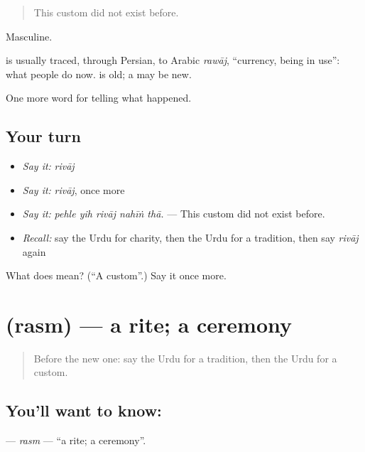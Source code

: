\begin{quote}
This custom did not exist before.
\end{quote}

Masculine.

\begin{cousinweb}
is usually traced, through Persian, to Arabic \emph{rawāj}, \textquotedblleft{}currency, being in use\textquotedblright{}: what people do now. \textbf{} is old; a \textbf{} may be new.
\end{cousinweb}

\begin{grammarlens}[title={What you've built}]
One more word for telling what happened.
\end{grammarlens}

\subsection*{Your turn}
\begin{itemize}
\raggedright
  \item \emph{Say it:} \emph{rivāj}
  \item \emph{Say it:} \emph{rivāj}, once more
  \item \emph{Say it:} \emph{pehle yih rivāj nahīṅ thā.} — This custom did not exist before.
  \item \emph{Recall:} say the Urdu for charity, then the Urdu for a tradition, then say \emph{rivāj} again
\end{itemize}

\begin{tcolorbox}[breakable,colback=teal!4,colframe=teal!35!black,title={Before you move on}]
What does  mean? (\textquotedblleft{}A custom\textquotedblright{}.) Say it once more.
\end{tcolorbox}
\section[\texorpdfstring{\ur{رسم} (rasm)}{رسم (rasm)}]{ (rasm) — a rite; a ceremony}

\label{lesson:UR-C323-rasm}



\begin{quote}
Before the new one: say the Urdu for a tradition, then the Urdu for a custom.
\end{quote}

\subsection*{You'll want to know: }
\textbf{} — \emph{rasm} — \textquotedblleft{}a rite; a ceremony\textquotedblright{}.

